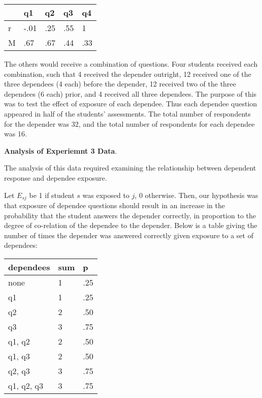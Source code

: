 \documentclass[a4paper,twocolumn]{article}
\begin{document}
\begin{center}
\begin{tabular}{|l|l|l|l|l|}
                                \hline
    &   q1 &  q2  & q3 & q4  \\ \hline
 r  & -.01 & .25 & .55 & 1   \\ \hline
 M  &  .67 & .67 & .44 & .33 \\ \hline
\end{tabular}
\end{center}

The others would receive a combination of questions. Four students received each
combination, such that 4 received the depender outright, 12 received one of the
three dependees (4 each) before the depender, 12 received two of the three
dependees (6 each) prior, and 4 received all three dependees.  The purpose of
this was to test the effect of exposure of each dependee.  Thus each dependee
question appeared in half of the students' assessments.  The total number of
respondents for the depender was 32, and the total number of respondents for
each dependee was 16. 

\textbf{Analysis of Experiemnt 3 Data}. 

The analysis of this data required examining the relationship between
dependent response and dependee exposure.

Let $E_{sj}$ be 1 if student $s$ was exposed to $j$, 0 otherwise.  Then, our
hypothesis was that exposure of dependee questions should result in an increase
in the probability that the student answers the depender correctly, in
proportion to the degree of co-relation of the dependee to the depender.  Below
is a table giving the number of times the depender was answered correctly given
exposure to a set of dependees:

\begin{center}
\begin{tabular}{|l|l|l|}
\hline
dependees    & sum &  p   \\ \hline
none         &  1  & .25  \\ \hline
q1           &  1  & .25  \\ \hline
q2           &  2  & .50  \\ \hline
q3           &  3  & .75  \\ \hline
q1, q2       &  2  & .50  \\ \hline
q1, q3       &  2  & .50  \\ \hline
q2, q3       &  3  & .75  \\ \hline
q1, q2, q3   &  3  & .75  \\ \hline
\end{tabular}
\end{center}
\end{document}
